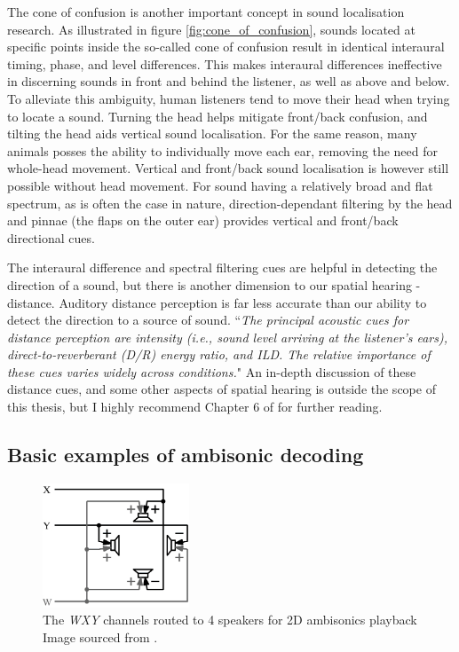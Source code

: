 The cone of confusion is another important concept in sound localisation research. 
As illustrated in figure \ref{fig:cone_of_confusion}, sounds located at specific points inside the so-called cone of 
confusion result in identical interaural timing, phase, and level differences. 
This makes interaural differences ineffective in discerning sounds in front and behind the listener, as well as above and below.
To alleviate this ambiguity, human listeners tend to move their head when trying to locate a sound.
Turning the head helps mitigate front/back confusion, and tilting the head aids vertical sound localisation.
For the same reason, many animals posses the ability to individually move each ear, removing the need for whole-head movement. \cite{new_realities_in_audio}
Vertical and front/back sound localisation is however still possible without head movement.
For sound having a relatively broad and flat spectrum, as is often the case in nature, 
direction-dependant filtering by the head and pinnae (the flaps on the outer ear)
provides vertical and front/back directional cues. \cite{localization_clinical_neurology}

The interaural difference and spectral filtering cues are helpful in detecting the direction of a sound,
but there is another dimension to our spatial hearing - distance.
Auditory distance perception is far less accurate than our ability to detect the direction to a source of sound. 
``\emph{The principal acoustic cues for distance perception are intensity (i.e., sound level arriving at the listener’s ears), 
direct-to-reverberant  (D/R)  energy  ratio,  and ILD. The relative importance of these cues varies widely across conditions.}" \cite{localization_clinical_neurology}
An in-depth discussion of these distance cues, and some other aspects of spatial hearing is outside the scope of this thesis, but I highly recommend 
Chapter 6 of \cite{localization_clinical_neurology} for further reading.

\subsection{Basic examples of ambisonic decoding}

\begin{figure}
    \centering
    \includegraphics[height=10em]{images/spatial_audio/WXY_playback.png}       
    \caption{The \emph{WXY} channels routed to 4 speakers for 2D ambisonics playback
        Image sourced from \cite{ambisonics_practical_theory}.
        \label{fig:wxy_decoding}}
\end{figure}

